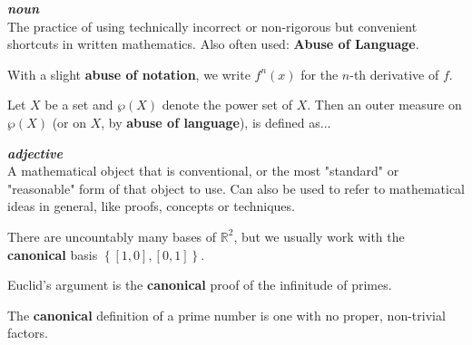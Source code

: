 \documentclass[12pt,x11names]{article}
\newcommand{\rr}{\mathbb{R}}
\newcommand{\set}[1]{\left\{ #1 \right\}}
\begin{document}
\begin{definition}
\textbf{\textit{noun}}\\
The practice of using technically incorrect or non-rigorous but convenient shortcuts in written mathematics. Also often used: \textbf{Abuse of Language}.
\end{definition}

\begin{example}
With a slight \textbf{abuse of notation}, we write $f^n(x)$ for the $n$-th derivative of $f$.
\end{example}

\begin{example}
Let $X$ be a set and $\wp(X)$ denote the power set of $X$. Then an outer measure on $\wp(X)$ (or on $X$, by \textbf{abuse of language}), is defined as... 
\end{example}

\begin{definition}[Ansatz]
    
\end{definition}

\begin{definition}[Canonical]
\textbf{\textit{adjective}}\\
A mathematical object that is conventional, or the most "standard" or "reasonable" form of that object to use. Can also be used to refer to mathematical ideas in general, like proofs, concepts or techniques.
\end{definition}

\begin{example}
    There are uncountably many bases of $\rr^2$, but we usually work with the \textbf{canonical} basis $\set{[1, 0], [0, 1]}$.
\end{example}

\begin{example}
    Euclid's argument is the \textbf{canonical} proof of the infinitude of primes.
\end{example}

\begin{example}
    The \textbf{canonical} definition of a prime number is one with no proper, non-trivial factors.
\end{example}

\begin{definition}[Characterize]
    
\end{definition}

\begin{definition}[Chasing]
    
\end{definition}
\end{document}
